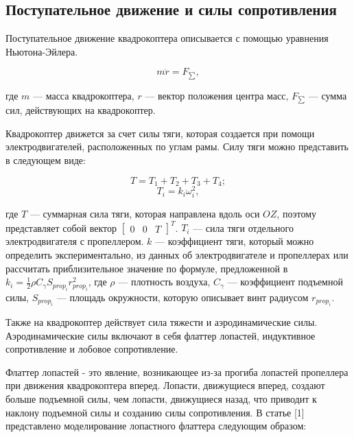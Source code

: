 \subsection{Поступательное движение и силы сопротивления}

Поступательное движение квадрокоптера описывается с помощью уравнения Ньютона-Эйлера. 

\begin{equation} m \ddot{r} = F_{\sum}, \end{equation}

где \(m\) --- масса квадрокоптера, 
\(r\) --- вектор положения центра масс, 
\(F_{\sum}\) --- сумма сил, действующих на квадрокоптер.

Квадрокоптер движется за счет силы тяги, которая создается при помощи электродвигателей, расположенных по углам рамы. Силу тяги можно представить 
в следующем виде:

\begin{equation}
T = T_{1} + T_{2} + T_{3} + T_{4};
\end{equation}
\begin{equation}
T_{i} = k_i \omega_i^2,
\end{equation}

где \(T\) --- суммарная сила тяги, которая направлена вдоль оси \(OZ\), поэтому представляет собой вектор \(\begin{bmatrix}
    0 & 0 & T
\end{bmatrix}^T\). \(T_i\) --- сила тяги отдельного электродвигателя с пропеллером.
\(k\) --- коэффициент тяги, который можно определить экспериментально, из данных об электродвигателе и пропеллерах или 
рассчитать приблизительное значение по формуле, предложенной в \cite{Lysukho}  \(k_i=\frac{1}{2}\rho C_{\gamma} S_{prop_i} r_{prop_i}^2\),
где \(\rho\) --- плотность воздуха, \(C_{\gamma}\) --- коэффициент подъемной силы, \(S_{prop_i}\) --- площадь окружности,
которую описывает винт радиусом \(r_{prop_i}\).


Также на квадрокоптер
действует сила тяжести и аэродинамические силы. Аэродинамические силы включают в себя флаттер лопастей, индуктивное сопротивление 
и лобовое сопротивление. 

Флаттер лопастей - это явление, возникающее из-за прогиба лопастей пропеллера при движения
квадрокоптера вперед. Лопасти, движущиеся вперед, создают больше подъемной силы, чем лопасти,
движущиеся назад, что приводит к наклону подъемной силы и созданию силы сопротивления. В 
статье [1] представлено моделирование лопастного флаттера следующим образом:

